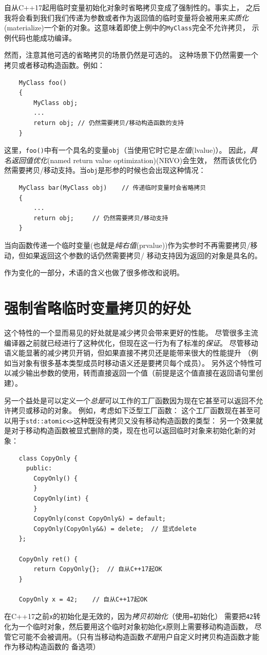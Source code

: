 自从C++17起用临时变量初始化对象时省略拷贝变成了强制性的。事实上，
之后我将会看到我们我们传递为参数或者作为返回值的临时变量将会被用来\emph{实质化}
(materialize)一个新的对象。这意味着即使上例中的\texttt{MyClass}完全不允许拷贝，
示例代码也能成功编译。

然而，注意其他可选的省略拷贝的场景仍然是可选的。
这种场景下仍然需要一个拷贝或者移动构造函数。例如：
\begin{lstlisting}
    MyClass foo()
    {
        MyClass obj;
        ...
        return obj; // 仍然需要拷贝/移动构造函数的支持
    }
\end{lstlisting}
这里，\texttt{foo()}中有一个具名的变量\texttt{obj}（当使用它时它是\emph{左值}(lvalue)）。
因此，\emph{具名返回值优化}(named return value optimization)(NRVO)会生效，
然而该优化仍然需要拷贝/移动支持。当\texttt{obj}是形参的时候也会出现这种情况：
\begin{lstlisting}
    MyClass bar(MyClass obj)    // 传递临时变量时会省略拷贝
    {
        ...
        return obj;     // 仍然需要拷贝/移动支持
    }
\end{lstlisting}
当向函数传递一个临时变量(也就是\emph{纯右值}(prvalue))作为实参时不再需要拷贝/移动，但如果返回这个参数的话仍然需要拷贝/
移动支持因为返回的对象是具名的。

作为变化的一部分，术语的含义也做了很多修改和说明。

\section{强制省略临时变量拷贝的好处}
这个特性的一个显而易见的好处就是减少拷贝会带来更好的性能。
尽管很多主流编译器之前就已经进行了这种优化，但现在这一行为有了标准的\emph{保证}。
尽管移动语义能显著的减少拷贝开销，但如果直接不拷贝还是能带来很大的性能提升
（例如当对象有很多基本类型成员时移动语义还是要拷贝每个成员）。
另外这个特性可以减少输出参数的使用，转而直接返回一个值（前提是这个值直接在返回语句里创建）。

另一个益处是可以定义一个\emph{总是}可以工作的工厂函数因为现在它甚至可以返回不允许拷贝或移动的对象。
例如，考虑如下泛型工厂函数：
这个工厂函数现在甚至可以用于\texttt{std::atomic<>}这种既没有拷贝又没有移动构造函数的类型：
另一个效果就是对于移动构造函数被显式删除的类，现在也可以返回临时对象来初始化新的对象：
\begin{lstlisting}
    class CopyOnly {
      public:
        CopyOnly() {
        }
        CopyOnly(int) {
        }
        CopyOnly(const CopyOnly&) = default;
        CopyOnly(CopyOnly&&) = delete;  // 显式delete
    };

    CopyOnly ret() {
        return CopyOnly{};  // 自从C++17起OK
    }

    CopyOnly x = 42;    // 自从C++17起OK
\end{lstlisting}
在C++17之前\texttt{x}的初始化是无效的，因为\emph{拷贝初始化}（使用\texttt{=}初始化）
需要把\texttt{42}转化为一个临时对象，然后要用这个临时对象初始化\texttt{x}原则上需要移动构造函数，
尽管它可能不会被调用。（只有当移动构造函数\emph{不是}用户自定义时拷贝构造函数才能作为移动构造函数的
备选项）

